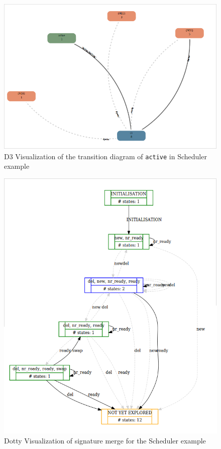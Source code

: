 \begin{figure}[h!]
\centering
\includegraphics[width=15cm]{bilder/transdiag-wo.png}
\caption{D3 Visualization of the transition diagram of \texttt{active} in Scheduler example}
\label{transdiag}
\end{figure}

\begin{figure}[h!]
\centering
\includegraphics[width=15cm]{bilder/dotty-sigmerge.png}
\caption{Dotty Visualization of signature merge for the Scheduler example}
\label{sigmergeDotty}
\end{figure}

